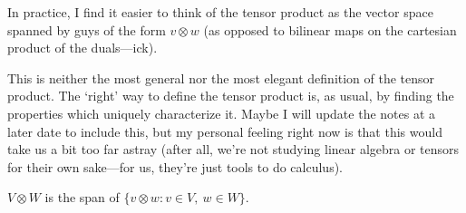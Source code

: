 \begin{dfn}
\begin{rmk}
\end{rmk}
\begin{rmk}
In practice, I find it easier to think of the tensor product as the vector space spanned by guys of the form $v\otimes w$ (as opposed to bilinear maps on the cartesian product of the duals---ick).
\end{rmk}
\begin{rmk}
This is neither the most general nor the most elegant definition of the tensor product.  The `right' way to define the tensor product is, as usual, by finding the properties which uniquely characterize it.  Maybe I will update the notes at a later date to include this, but my personal feeling right now is that this would take us a bit too far astray (after all, we're not studying linear algebra or tensors for their own sake---for us, they're just tools to do calculus).
\end{rmk}
\end{dfn}
\begin{prp}\label{prp5.1.8}
$V\otimes W$ is the span of $\{ v\otimes w:v\in V,\ w\in W\}$.
\end{prp}
